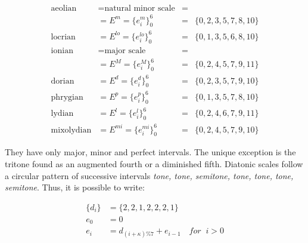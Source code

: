 \documentclass[format=acmsmall, review=false, screen=true]{acmart}
\begin{document}
\begin{equation}\label{eq:escalas}
\begin{aligned}
	\text{aeolian}    & = \text{natural minor scale}  & = & \\
			  & = E^m = \{e_i^m\}_0^6       & = & \{0,2,3,5,7,8,10\} \\
	\text{locrian}    & = E^{lo} = \{e_i^{lo}\}_0^6 & = & \{0,1,3,5,6,8,10\} \\ 
	\text{ionian}     & = \text{major scale}          & = &  \\
			  & = E^M = \{e_i^M\}_0^6       & = & \{0,2,4,5,7,9,11\} \\
	\text{dorian}     & = E^{d} = \{e_i^{d}\}_0^6   & = & \{0,2,3,5,7,9,10\} \\
	\text{phrygian}   & = E^{p} = \{e_i^{p}\}_0^6   & = & \{0,1,3,5,7,8,10\} \\
	\text{lydian}     & = E^{l}=\{e_i^{l}\}_0^6     & = & \{0,2,4,6,7,9,11\} \\
	\text{mixolydian} & = E^{mi} = \{e_i^{mi}\}_0^6 & = & \{0,2,4,5,7,9,10\}
\end{aligned}
\end{equation}

\noindent They have only major, minor and perfect intervals.
The unique exception is the tritone found as an augmented fourth or a diminished fifth.
Diatonic scales follow a circular pattern of successive intervals \textit{tone, tone, semitone, tone, tone, tone, semitone}. Thus, it is possible to write:

\begin{equation}\label{eq:relacaoDia}
\begin{split}
\{d_i\} & =\{2,2,1,2,2,2,1\} \\
e_0 & =0 \\
e_i & =d_{(i+\kappa)\%7}+e_{i-1} \quad for \;\;  i > 0
\end{split}
\end{equation}
\end{document}
